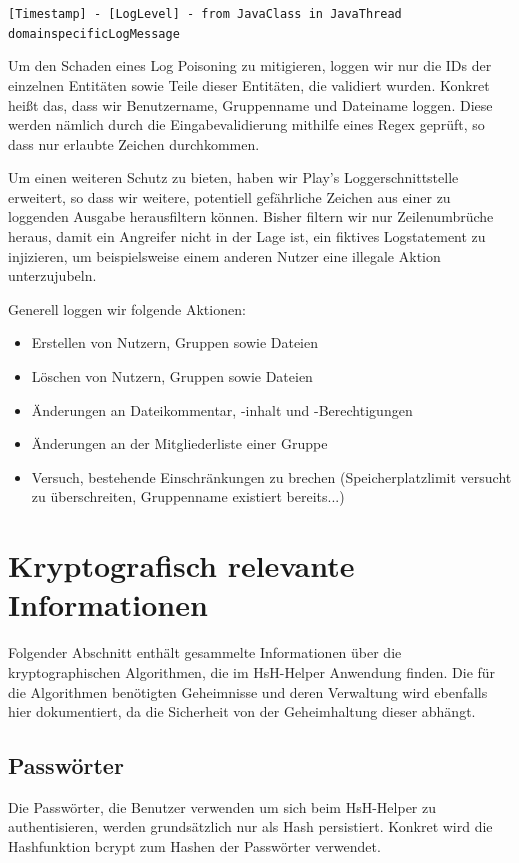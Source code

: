 \documentclass[12pt,DIV14,BCOR10mm,a4paper,parskip=half-,headsepline,headinclude,english,ngerman,bibliography=totocnumbered]{scrreprt}
\begin{document}
\texttt{[Timestamp] - [LogLevel] - from JavaClass in JavaThread\\
domainspecificLogMessage}

Um den Schaden eines Log Poisoning zu mitigieren, loggen wir nur die IDs der einzelnen Entitäten sowie Teile dieser Entitäten, die validiert wurden.
Konkret heißt das, dass wir Benutzername, Gruppenname und Dateiname loggen.
Diese werden nämlich durch die Eingabevalidierung mithilfe eines Regex geprüft, so dass nur erlaubte Zeichen durchkommen.

Um einen weiteren Schutz zu bieten, haben wir Play's Loggerschnittstelle erweitert, so dass wir weitere, potentiell gefährliche Zeichen aus einer zu loggenden Ausgabe herausfiltern können.
Bisher filtern wir nur Zeilenumbrüche heraus, damit ein Angreifer nicht in der Lage ist, ein fiktives Logstatement zu injizieren, um beispielsweise einem anderen Nutzer eine illegale Aktion unterzujubeln.

Generell loggen wir folgende Aktionen:
\begin{itemize}
	\item Erstellen von Nutzern, Gruppen sowie Dateien
	\item Löschen von Nutzern, Gruppen sowie Dateien
	\item Änderungen an Dateikommentar, -inhalt und -Berechtigungen
	\item Änderungen an der Mitgliederliste einer Gruppe
	\item Versuch, bestehende Einschränkungen zu brechen (Speicherplatzlimit versucht zu überschreiten, Gruppenname existiert bereits...)
\end{itemize}

\chapter{Kryptografisch relevante Informationen}
Folgender Abschnitt enthält gesammelte Informationen über die kryptographischen Algorithmen, die im HsH-Helper Anwendung finden. Die für die Algorithmen benötigten Geheimnisse und deren Verwaltung wird ebenfalls hier dokumentiert, da die Sicherheit von der Geheimhaltung dieser abhängt.

\section{Passwörter}
Die Passwörter, die Benutzer verwenden um sich beim HsH-Helper zu authentisieren, werden grundsätzlich nur als Hash persistiert. Konkret wird die Hashfunktion bcrypt zum Hashen der Passwörter verwendet.
\end{document}
